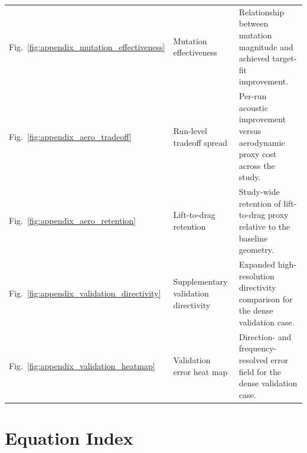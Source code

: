 \documentclass[11pt]{article}
\begin{document}
\begin{longtable}{@{}L{0.13\textwidth}L{0.24\textwidth}L{0.57\textwidth}@{}}
Fig.~\ref{fig:appendix_mutation_effectiveness} & Mutation effectiveness & Relationship between mutation magnitude and achieved target-fit improvement. \\
Fig.~\ref{fig:appendix_aero_tradeoff} & Run-level tradeoff spread & Per-run acoustic improvement versus aerodynamic proxy cost across the study. \\
Fig.~\ref{fig:appendix_aero_retention} & Lift-to-drag retention & Study-wide retention of lift-to-drag proxy relative to the baseline geometry. \\
Fig.~\ref{fig:appendix_validation_directivity} & Supplementary validation directivity & Expanded high-resolution directivity comparison for the dense validation case. \\
Fig.~\ref{fig:appendix_validation_heatmap} & Validation error heat map & Direction- and frequency-resolved error field for the dense validation case. \\
\end{longtable}

\clearpage

\section{Equation Index}
\end{document}
